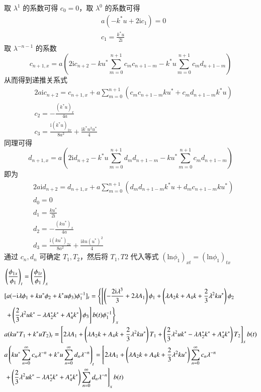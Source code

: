 取 $\lambda^{1}$ 的系数可得 $c_{0} = 0$，取 $\lambda^{0}$ 的系数可得
\begin{align}
  & a(-k^{*}u + 2\mathrm{i}c_{1}) = 0 \\
  & c_{1} = \frac{k^{*}u}{2\mathrm{i}}
\end{align}
取 $\lambda^{-n-1}$ 的系数
\begin{equation}
  c_{n+1,x} = a\left(2\mathrm{i}c_{n+2} - ku^{*}\sum_{m=0}^{n+1}c_{m}c_{n+1-m} - k^{*}u\sum_{m=0}^{n+1}c_{m}d_{n+1-m}\right)
\end{equation}
从而得到递推关系式
\begin{align}
  & 2a\mathrm{i}c_{n+2} = c_{n+1,x} + a\sum_{m=0}^{n+1}(c_{m}c_{n+1-m}ku^{*} + c_{m}d_{n+1-m}k^{*}u) \\
  & c_{2} = -\frac{(k^{*}u)_{x}}{4a} \\
  & c_{3} = \frac{\mathrm{i}(k^{*}u)_{2x}}{8a^{2}} + \frac{\mathrm{i}k^{*}u^{2}u^{*}}{4}
\end{align}
同理可得
\begin{equation}
  d_{n+1,x} = a\left(2\mathrm{i}d_{n+2} - k^{*}u\sum_{m=0}^{n+1}d_{m}d_{n+1-m} - ku^{*}\sum_{m=0}^{n+1}c_{m}d_{n+1-m}\right)
\end{equation}
即为
\begin{align}
  & 2a\mathrm{i}d_{n+2} = d_{n+1,x} + a\sum_{m=0}^{n+1}(d_{m}d_{n+1-m}k^{*}u + d_{m}c_{n+1-m}ku^{*}) \\
  & d_{0} = 0 \\
  & d_{1} = \frac{ku^{*}}{2\mathrm{i}} \\
  & d_{2} = -\frac{(ku^{*})_{x}}{4a} \\
  & d_{3} = \frac{\mathrm{i}(ku^{*})_{2x}}{8a^{2}} + \frac{\mathrm{i}ku(u^{*})^{2}}{4}
\end{align}
通过 $c_{n}, d_{n}$ 可确定 $T_{1}, T_{2}$，然后将 $T_{1}, T{2}$ 代入等式 $(\mathrm{ln} \phi_{1})_{xt} = (\mathrm{ln} \phi_{1})_{tx}$
\begin{align}
  & \left(\frac{\phi_{1x}}{\phi_{1}}\right)_{t} = \left(\frac{\phi_{1t}}{\phi_{1}}\right)_{x} \\
  & [a(-\mathrm{i}\lambda\phi_{1} + ku^{*}\phi_{2} +k^{*}u\phi_{3})\phi_{1}^{-1}]_{t} = \left\{\left[\left(-\frac{2\mathrm{i}\lambda^{3}}{3}+2\lambda A_{1}\right)\phi_{1} + \left(\lambda A_{2}k+A_{4}k+\frac{2}{3}\lambda^{2}ku^{*}\right)\phi_{2} \right.\right. \notag\\
  & \left.\left. + \left(\frac{2}{3}\lambda^{2}uk^{*}-\lambda A_{2}^{*}k^{*}+A_{4}^{*}k^{*}\right)\phi_{3}\right]b(t)\phi_{1}^{-1}\right\}_{x} \\
  & a(ku^{*}T_{1} + k^{*}uT_{2})_{t} = \left[2\lambda A_{1} + \left(\lambda A_{2}k+A_{4}k+\frac{2}{3}\lambda^{2}ku^{*}\right)T_{1} + \left(\frac{2}{3}\lambda^{2}uk^{*}-\lambda A_{2}^{*}k^{*}+A_{4}^{*}k^{*}\right)T_{2}\right]_{x}b(t) \\
  & a\left(ku^{*}\sum_{n=0}^{\infty}c_{n}\lambda^{-n} + k^{*}u\sum_{n=0}^{\infty}d_{n}\lambda^{-n}\right)_{t} = \left[2\lambda A_{1} + \left(\lambda A_{2}k+A_{4}k+\frac{2}{3}\lambda^{2}ku^{*}\right)\sum_{n=0}^{\infty}c_{n}\lambda^{-n} \right. \notag\\
  & \left. + \left(\frac{2}{3}\lambda^{2}uk^{*}-\lambda A_{2}^{*}k^{*}+A_{4}^{*}k^{*}\right)\sum_{n=0}^{\infty}d_{n}\lambda^{-n}\right]_{x}b(t)
\end{align}
